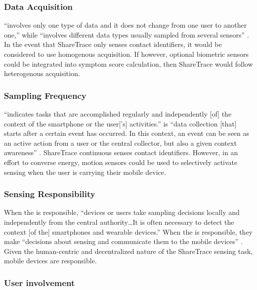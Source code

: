 \subsubsection{Data Acquisition}

 ``involves only one type of data and it does not change from one user to another one,'' while  ``involves different data types usually sampled from several sensors'' \citep{Capponi2019}. In the event that ShareTrace only senses contact identifiers, it would be considered to use homogenous acquisition. If however, optional biometric sensors could be integrated into symptom score calculation, then ShareTrace would follow heterogenous acquisition.

\subsubsection{Sampling Frequency}

 ``indicates tasks that are accomplished regularly and independently [of] the context of the smartphone or the user['s] activities.''  is ``data collection [that] starts after a certain event has occurred. In this context, an event can be seen as an active action from a user or the central collector, but also a given context awareness'' \citep{Capponi2019}. ShareTrace continuous senses contact identifiers. However, in an effort to converse energy, motion sensors could be used to selectively activate sensing when the user is carrying their mobile device.

\subsubsection{Sensing Responsibility}

When the  is responsible, ``devices or users take sampling decisions locally and independently from the central authority{\ldots}It is often necessary to detect the context [of the] smartphones and wearable devices.'' When the  is responsible, they make ``decisions about sensing and communicate them to the mobile devices'' \citep{Capponi2019}. Given the human-centric and decentralized nature of the ShareTrace sensing task, mobile devices are responsible.

\subsubsection{User involvement}

